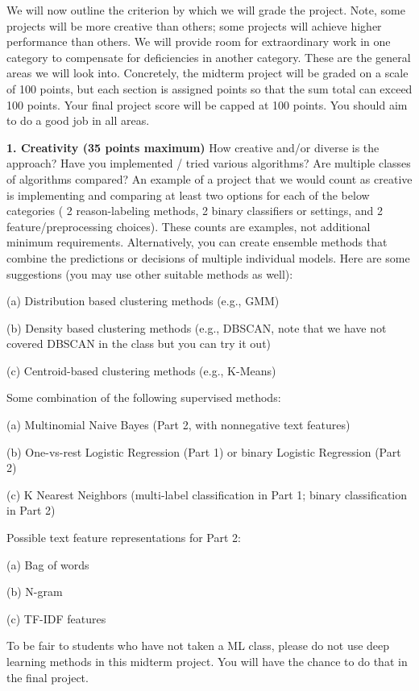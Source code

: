 \documentclass[11pt,letterpaper]{article}
\begin{document}
We will now outline the criterion by which we will grade the project. Note, some projects will be
more creative than others; some projects will achieve higher performance than others. We will
provide room for extraordinary work in one category to compensate for deficiencies in another
category. These are the general areas we will look into. Concretely, the midterm project will be
graded on a scale of 100 points, but each section is assigned points so that the sum total can
exceed 100 points. Your final project score will be capped at 100 points. You should aim to do a
good job in all areas.

\textbf{1. Creativity (35 points maximum)} How creative and/or diverse is the approach? Have you implemented / tried various algorithms? Are multiple classes of algorithms compared? An example of a project that we would count as creative is implementing and comparing at least two options for each of the below categories ( 2 reason-labeling methods, 2 binary classifiers or settings, and 2 feature/preprocessing choices). These counts are examples, not additional minimum requirements. Alternatively, you can create ensemble methods that combine the predictions or decisions of multiple individual models. Here are some suggestions (you may use other suitable methods as well):

(a) Distribution based clustering methods (e.g., GMM)

(b) Density based clustering methods (e.g., DBSCAN, note that we have not covered DBSCAN in the
class but you can try it out)

(c) Centroid-based clustering methods (e.g., K-Means)

Some combination of the following supervised methods:

(a) Multinomial Naive Bayes (Part 2, with nonnegative text features)

(b) One-vs-rest Logistic Regression (Part 1) or binary Logistic Regression (Part 2)

(c) K Nearest Neighbors (multi-label classification in Part 1; binary classification in Part 2)

Possible text feature representations for Part 2:

(a) Bag of words

(b) N-gram

(c) TF-IDF features

To be fair to students who have not taken a ML class, please do not use deep learning methods in
this midterm project. You will have the chance to do that in the final project.
\end{document}
